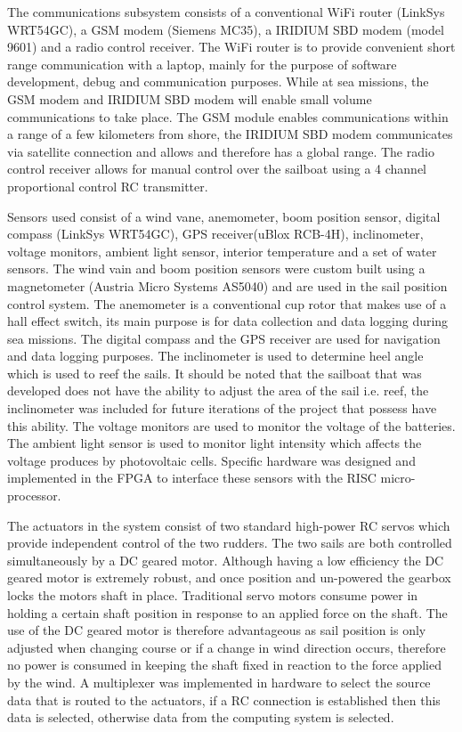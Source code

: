 The communications subsystem consists of a conventional WiFi router (LinkSys WRT54GC), a GSM modem (Siemens MC35), a IRIDIUM SBD modem (model 9601) and a radio control receiver. 
The WiFi router is to provide convenient short range communication with a laptop, mainly for the purpose of software development, debug and communication purposes. While at sea 
missions, the GSM modem and IRIDIUM SBD modem will enable small volume communications to take place. The GSM module enables communications within a range of a few kilometers from 
shore, the IRIDIUM SBD modem communicates via satellite connection and allows and therefore has a global range. The radio control receiver allows for manual control over the sailboat
 using a 4 channel proportional control RC transmitter.

Sensors used consist of a wind vane, anemometer, boom position sensor, digital compass (LinkSys WRT54GC), GPS receiver(uBlox RCB-4H), inclinometer, voltage monitors, ambient light 
sensor, interior temperature and a set of water sensors. The wind vain and boom position sensors were custom built using a magnetometer (Austria Micro Systems AS5040) and are used 
in the sail position control system. The anemometer is a conventional cup rotor that makes use of a hall effect switch, its main purpose is for data collection and data logging during 
sea missions. The digital compass and the GPS receiver are used for navigation and data logging purposes. The inclinometer is used to determine heel angle which is used to reef the sails. 
It should be noted that the sailboat that was developed does not have the ability to adjust the area of the sail i.e. reef, the inclinometer was included for future iterations of the 
project that possess have this ability. The voltage monitors are used to monitor the voltage of the batteries. The ambient light sensor is used to monitor light intensity which affects
 the voltage produces by photovoltaic cells. Specific hardware was designed and implemented in the FPGA to interface these sensors with the RISC micro-processor.

The actuators in the system consist of two standard high-power RC servos which provide independent control of the two rudders. The two sails are both controlled simultaneously by a 
DC geared motor. Although having a low efficiency the DC geared motor is extremely robust, and once position and un-powered the gearbox locks the motors shaft in place. Traditional 
servo motors consume power in holding a certain shaft position in response to an applied force on the shaft. The use of the DC geared motor is therefore advantageous as sail position
is only adjusted when changing course or if a change in wind direction occurs, therefore no power is consumed in keeping the shaft fixed in reaction to the force applied by the wind. 
A multiplexer was implemented in hardware to select the source data that is routed to the actuators, if a RC connection is established then this data is selected, otherwise data from 
the computing system is selected.
 
